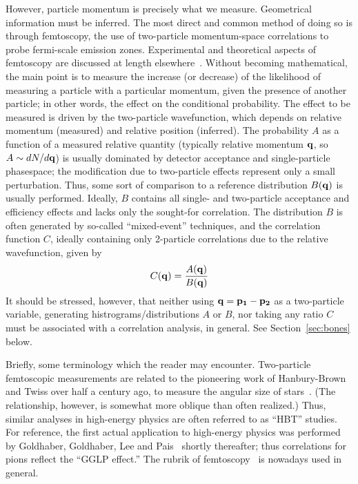 \documentclass[twoside]{article}
\begin{document}
However, particle momentum is precisely what we measure.  Geometrical information must be
inferred.  The most direct and common method of doing so is through femtoscopy, the use of
two-particle momentum-space correlations to probe fermi-scale emission zones.  Experimental
and theoretical aspects of femtoscopy are discussed at length
elsewhere~\citep[][and references within]{Lisa:2005dd}.  Without becoming mathematical, the
main point is to measure the increase (or decrease) of the likelihood of measuring a particle
with a particular momentum, given the presence of another particle; in other words, the effect
on the conditional probability.  The effect to be measured is driven by the two-particle wavefunction, which
depends on relative momentum (measured) and relative position (inferred).  The probability $A$
as a function of a measured relative quantity (typically relative momentum 
${\bf q}$, so $A \sim dN/d{\bf q}$) is usually dominated by detector acceptance and single-particle
phasespace; the modification due to two-particle effects represent only a small perturbation.
Thus, some sort of comparison to a reference distribution $B({\bf q})$ is usually performed.
Ideally, $B$ contains all single- and two-particle acceptance and efficiency effects and lacks
only the sought-for correlation.  The distribution $B$ is often generated by so-called ``mixed-event''
techniques, and the correlation function $C$, ideally containing only 2-particle
correlations due to the relative wavefunction, given by
\begin{equation}
\label{eq:usualC}
C({\bf q})=\frac{A({\bf q})}{B({\bf q})}
\end{equation}
It should be stressed, however, that neither using ${\bf q}={\bf p_1}-{\bf p_2}$ as a two-particle
variable, generating histrograms/distributions $A$ or $B$, nor taking any ratio $C$ must be associated
with a correlation analysis, in general.  See Section~\ref{sec:bones} below.

Briefly, some terminology which the reader may encounter.  Two-particle femtoscopic measurements
are related to the pioneering work of Hanbury-Brown and Twiss over half a century ago, to measure
the angular size of stars~\cite{HanburyBrown:1954}.  (The relationship, however, is somewhat more
oblique than often realized.)  Thus, similar analyses in high-energy physics
are often referred to as ``HBT'' studies.  For reference,
the first actual application to high-energy physics was performed by Goldhaber, Goldhaber,
Lee and Pais~\cite{Goldhaber:1960sf} shortly thereafter; thus correlations for pions reflect
the ``GGLP effect.''  The rubrik of femtoscopy~\cite{Lednicky:2002fq} is nowadays
used in general.
\end{document}

